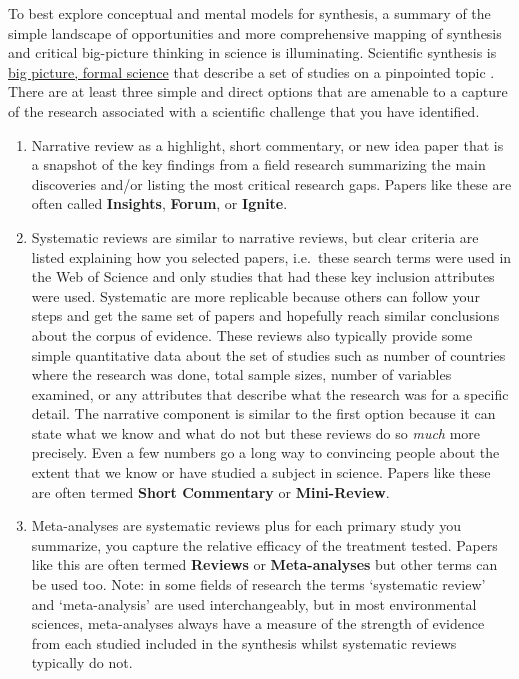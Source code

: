 \documentclass[
]{book}
\begin{document}
To best explore conceptual and mental models for synthesis, a summary of the simple landscape of opportunities and more comprehensive mapping of synthesis and critical big-picture thinking in science is illuminating. Scientific synthesis is \href{https://onlinelibrary.wiley.com/doi/full/10.1111/j.1600-0706.2013.00970.x}{big picture, formal science} that describe a set of studies on a pinpointed topic \citep{RN3216}. There are at least three simple and direct options that are amenable to a capture of the research associated with a scientific challenge that you have identified.

\begin{enumerate}
\def\labelenumi{(\arabic{enumi})}
\item
  Narrative review as a highlight, short commentary, or new idea paper that is a snapshot of the key findings from a field research summarizing the main discoveries and/or listing the most critical research gaps. Papers like these are often called \textbf{Insights}, \textbf{Forum}, or \textbf{Ignite}.
\item
  Systematic reviews are similar to narrative reviews, but clear criteria are listed explaining how you selected papers, i.e.~these search terms were used in the Web of Science and only studies that had these key inclusion attributes were used. Systematic are more replicable because others can follow your steps and get the same set of papers and hopefully reach similar conclusions about the corpus of evidence. These reviews also typically provide some simple quantitative data about the set of studies such as number of countries where the research was done, total sample sizes, number of variables examined, or any attributes that describe what the research was for a specific detail. The narrative component is similar to the first option because it can state what we know and what do not but these reviews do so \emph{much} more precisely. Even a few numbers go a long way to convincing people about the extent that we know or have studied a subject in science. Papers like these are often termed \textbf{Short Commentary} or \textbf{Mini-Review}.
\item
  Meta-analyses are systematic reviews plus for each primary study you summarize, you capture the relative efficacy of the treatment tested. Papers like this are often termed \textbf{Reviews} or \textbf{Meta-analyses} but other terms can be used too. Note: in some fields of research the terms `systematic review' and `meta-analysis' are used interchangeably, but in most environmental sciences, meta-analyses always have a measure of the strength of evidence from each studied included in the synthesis whilst systematic reviews typically do not.
\end{enumerate}
\end{document}
